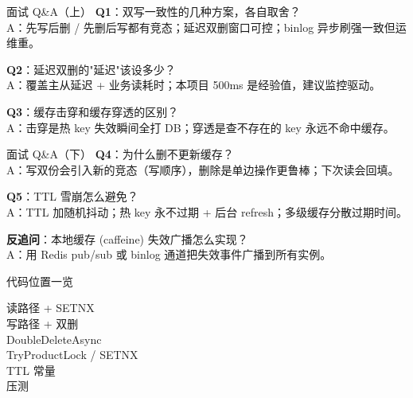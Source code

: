 \appendix

\begin{frame}{面试 Q\&A（上）}
\textbf{Q1}：双写一致性的几种方案，各自取舍？\\
\hspace{4mm}\small A：先写后删 / 先删后写都有竞态；延迟双删窗口可控；binlog 异步刷强一致但运维重。

\vspace{2mm}
\textbf{Q2}：延迟双删的"延迟"该设多少？\\
\hspace{4mm}\small A：覆盖主从延迟 + 业务读耗时；本项目 500ms 是经验值，建议监控驱动。

\vspace{2mm}
\textbf{Q3}：缓存击穿和缓存穿透的区别？\\
\hspace{4mm}\small A：击穿是热 key 失效瞬间全打 DB；穿透是查不存在的 key 永远不命中缓存。
\end{frame}

\begin{frame}{面试 Q\&A（下）}
\textbf{Q4}：为什么删不更新缓存？\\
\hspace{4mm}\small A：写双份会引入新的竞态（写顺序），删除是单边操作更鲁棒；下次读会回填。

\vspace{2mm}
\textbf{Q5}：TTL 雪崩怎么避免？\\
\hspace{4mm}\small A：TTL 加随机抖动；热 key 永不过期 + 后台 refresh；多级缓存分散过期时间。

\vspace{2mm}
\textbf{反追问}：本地缓存 (caffeine) 失效广播怎么实现？\\
\hspace{4mm}\small A：用 Redis pub/sub 或 binlog 通道把失效事件广播到所有实例。
\end{frame}

\begin{frame}{代码位置一览}
\begin{description}
  \item[读路径 + SETNX]
  \item[写路径 + 双删]
  \item[DoubleDeleteAsync]
  \item[TryProductLock / SETNX]
  \item[TTL 常量]
  \item[压测]
\end{description}
\vspace{2mm}
\end{frame}


